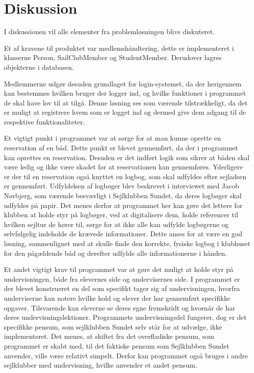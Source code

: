 \chapter{Diskussion}

I diskussionen vil alle elementer fra problemløsningen blive diskuteret.

Et af kravene til produktet var medlemshåndtering, dette er implementeret i klasserne Person, SailClubMember og StudentMember. 
Derudover lagres objekterne i databasen. 

Medlemmerne udgør desuden grundlaget for login-systemet, da der herigennem kan bestemmes hvilken bruger der logger ind, og hvilke funktioner i programmet de skal have lov til at tilgå.  
Denne løsning ses som værende tilstrækkeligt, da det er muligt at registrere hvem som er logget ind og dermed give dem adgang til de respektive funktionaliteter. 

Et vigtigt punkt i programmet var at sørge for at man kunne oprette en reservation af en båd. 
Dette punkt er blevet gennemført, da der i programmet kan oprettes en reservation. 
Desuden er det indført logik som sikrer at båden skal være ledig og ikke være skadet før at reservationen kan gennemføres. 
Yderligere er der til en reservation også knyttet en logbog, som skal udfyldes efter sejladsen er gennemført. 
Udfyldelsen af logbøger blev beskrevet i interviewet med Jacob Nørbjerg, som værende besværligt i Sejlklubben Sundet, da deres logbøger skal udfyldes på papir. 
Det menes derfor at programmet her kan gøre det lettere for klubben at holde styr på logbøger, ved at digitalisere dem, holde referencer til hvilken sejltur de hører til, sørge for at ikke alle kan udfylde logbøgerne og selvfølgelig indeholde de krævede informationer. 
Dette anses for at være en god løsning, sammenlignet med at skulle finde den korrekte, fysiske logbog i klubhuset for den pågældende båd og derefter udfylde alle informationerne i hånden. 


Et andet vigtigt krav til programmet var at gøre det muligt at holde styr på undervisningen, både fra elevernes side og undervisernes side. 
I programmet er der blevet konstrueret en del som specifikt tager sig af undervisningen, hvorfra underviserne kan notere hvilke hold og elever der har gennemført specifikke opgaver.
Tilsvarende kan eleverne se deres egne fremskridt og hvornår de har deres undervisningslektioner.
Programmets undervisningsdel fungerer, dog er det specifikke pensum, som sejlklubben Sundet selv står for at udvælge, ikke implementeret. 
Det menes, at skiftet fra det overfladiske pensum, som programmet er skabt med, til det faktiske pensum som Sejlklubben Sundet anvender, ville være relativt simpelt. 
Derfor kan programmet også bruges i andre sejlklubber med undervisning, hvilke anvender et andet pensum.

